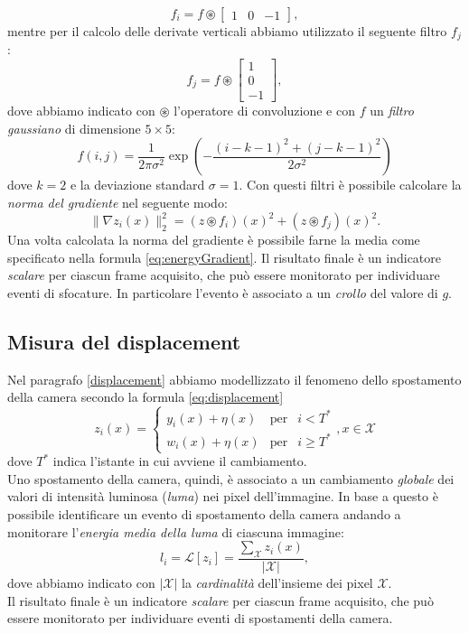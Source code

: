 \[f_i = f \circledast \left[ \begin{array}{rcl}
1 & 0 & -1
\end{array}\right], \] 
mentre per il calcolo delle derivate verticali  abbiamo utilizzato il seguente filtro $f_j$:
\[f_j = f \circledast \left[ \begin{array}{r}
1 \\ 0 \\ -1
\end{array}\right], \]
dove abbiamo indicato con $\circledast$ l'operatore di convoluzione e con $f$ un \textit{filtro gaussiano} di dimensione $5 \times 5$:
\[f(i,j)=\frac{1}{2\pi\sigma^2}\exp\left(-\frac{\left(i-k-1\right)^2+\left(j-k-1\right)^2}{2\sigma^2}\right)\] 
dove $k=2$ e  la deviazione standard $\sigma = 1$.
Con questi filtri \`e possibile calcolare la \textit{norma del gradiente} nel seguente modo:
\[\| \nabla z_i(x) \|_2^2=\left(z \circledast f_i\right)(x)^2 + \left(z \circledast f_j\right)(x)^2.\]
Una volta calcolata la norma del gradiente \`e possibile farne la media come specificato nella formula \eqref{eq:energyGradient}.
Il risultato finale \`e un indicatore \textit{scalare} per ciascun frame acquisito, che pu\`o essere monitorato per individuare eventi di sfocature. 
In particolare l'evento \`e associato a un \textit{crollo} del valore di $g$.
\subsection{Misura del displacement}
Nel paragrafo \ref{displacement} abbiamo modellizzato il fenomeno dello spostamento della camera secondo la formula \eqref{eq:displacement}
\[z_i(x)  = \left\{ \begin{array}{rcl}
y_i(x) + \eta(x) & \mbox{per} & i < T^* \\
w_i(x) + \eta(x) & \mbox{per} & i \geqslant T^*
\end{array}\right. , x \in \mathcal{X}\]
dove $T^*$ indica l'istante in cui avviene il cambiamento.\\
Uno spostamento della camera, quindi, \`e associato a un cambiamento \textit{globale} dei valori di intensit\`a luminosa (\textit{luma}) nei pixel dell'immagine.
In base a questo \`e possibile identificare un evento di spostamento della camera andando a monitorare l'\textit{energia media della luma} di ciascuna immagine:
\begin{equation}
\label{eq:energyLuma}
l_i = \mathcal{L}[z_i] =\frac{\sum_{\mathcal{X}} z_i(x) }{|\mathcal{X}|} ,
\end{equation}  
dove abbiamo indicato con $|\mathcal{X}|$ la \textit{cardinalit\`a} dell'insieme dei pixel $\mathcal{X}$.\\
Il risultato finale \`e un indicatore \textit{scalare} per ciascun frame acquisito, che pu\`o essere monitorato per individuare eventi di spostamenti della camera. 
